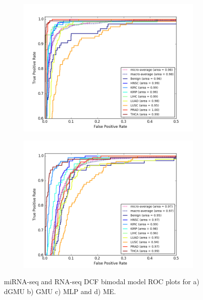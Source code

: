 \begin{figure}[H]
\begin{subfigure}[b]{0.49\textwidth}
         \caption{}
     \end{subfigure}
     \hfill
     \begin{subfigure}[b]{0.49\textwidth}
         \centering
         \includegraphics[width=\textwidth]{img/m_r/m_r_dcf_mlp_roc.png}
         \caption{}
     \end{subfigure}
     \begin{subfigure}[b]{0.49\textwidth}
         \centering
         \includegraphics[width=\textwidth]{img/m_r/m_r_dcf_moe_roc.png}
         \caption{}
     \end{subfigure}
        \caption{miRNA-seq and RNA-seq DCF bimodal model ROC plots for a) dGMU b) GMU c) MLP and d) ME.}
        \label{fig:m_r_dcf_roc}
\end{figure}

